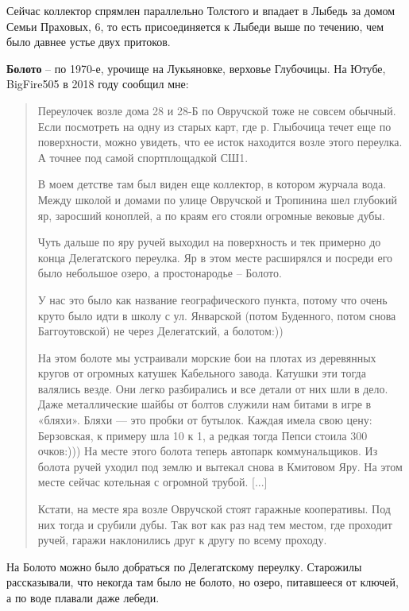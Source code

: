 Сейчас коллектор спрямлен параллельно Толстого и впадает в Лыбедь за домом Семьи Праховых, 6, то есть присоединяется к Лыбеди выше по течению, чем было давнее устье двух притоков.\\

\medskip

\textbf{Болото} – по 1970-е, урочище на Лукьяновке, верховье Глубочицы. На Ютубе, BigFire505 в 2018 году сообщил мне:

\begin{quotation}
Переулочек возле дома 28 и 28-Б по Овручской тоже не совсем обычный. Если посмотреть на одну из старых карт, где р. Глыбочица течет еще по поверхности, можно увидеть, что ее исток находится возле этого переулка. А точнее под самой спортплощадкой СШ1. 

В моем детстве там был виден еще коллектор, в котором журчала вода. Между школой и домами по улице Овручской и Тропинина шел глубокий яр, заросший коноплей, а по краям его стояли огромные вековые дубы. 

Чуть дальше по яру ручей выходил на поверхность и тек примерно до конца Делегатского переулка. Яр в этом месте расширялся и посреди его было небольшое озеро, а простонародье – Болото. 

У нас это было как название географического пункта, потому что оч\-ень круто было идти в школу с ул. Январской (потом Буденного, потом снова Баггоутовской) не через Делегатский, а болотом:))

На этом болоте мы устраивали морские бои на плотах из деревянных кругов от огромных катушек Кабельного завода. Катушки эти тогда валялись везде. Они легко разбирались и все детали от них шли в дело. Даже металлические шайбы от болтов служили нам битами в игре в «бляхи». Бляхи — это пробки от бутылок. Каждая имела свою цену: Берзовская, к примеру шла 10 к 1, а редкая тогда Пепси стоила 300 очков:))) На месте этого болота теперь автопарк коммунальщиков. Из болота ручей уходил под землю и вытекал снова в Кмитовом Яру. На этом месте сейчас котельная с огромной трубой. [...]

Кстати, на месте яра возле Овручской стоят гаражные кооперативы. Под них тогда и срубили дубы. Так вот как раз над тем местом, где проходит ручей, гаражи наклонились друг к другу по всему проходу.﻿
\end{quotation} 

На Болото можно было добраться по Делегатскому переулку. Старожилы рассказывали, что некогда там было не болото, но озеро, питавшееся от ключей, а по воде плавали даже лебеди.

